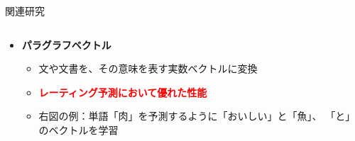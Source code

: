 \documentclass[unicode,10pt]{beamer}
\newcommand{\itemtitle}[1]{\textbf{#1}\\}
\newcommand{\fire}[1]{\textcolor{red}{\textbf{#1}}}
\newcommand{\doublecolumns}[4]{
    \begin{minipage}[t]{#1}
      #2
    \end{minipage}
    \begin{minipage}[t]{#3}
      #4
    \end{minipage}}
\begin{document}
\begin{frame}[t]
\begin{block}{関連研究}
\begin{columns}[onlytextwidth,t]
    \begin{column}{0.3\textwidth}
      \begin{itemize}
        \item \itemtitle{パラグラフベクトル\cite{quoc14}}
          \begin{itemize}
            \item 文や文書を、その意味を表す実数ベクトルに変換
            \item \fire{レーティング予測において優れた性能}
            \item 右図の例：単語「肉」を予測するように「おいしい」と「魚」、
                  「と」のベクトルを学習
          \end{itemize}
      \end{itemize}
    \end{column}


\end{columns}
\end{block}
\end{frame}
\end{document}
